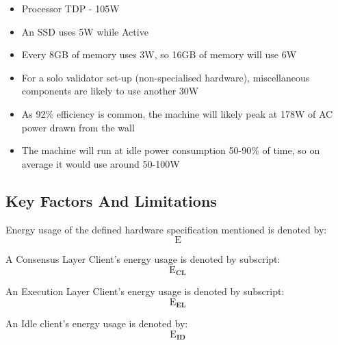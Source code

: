 \begin{itemize}
    \item Processor TDP - 105W
    
    \item An SSD uses 5W while Active
    
    \item Every 8GB of memory uses 3W, so 16GB of memory will use 6W
    
    \item For a solo validator set-up (non-specialised hardware), miscellaneous components are likely to use another 30W
    
    \item As 92\% efficiency is common, the machine will likely peak at 178W of AC power drawn from the wall
    
    \item The machine will run at idle power consumption 50-90\% of time, so on average it would use around 50-100W
    
\end{itemize}







\subsection {Key Factors And Limitations}


Energy usage of the defined hardware specification mentioned is denoted by:
\label{CCRIEquation}
\begin{equation*}
    \boldsymbol{\mathrm{E}}
\end{equation*} 

A Consensus Layer Client's energy usage is denoted by subscript:
\begin{equation*}
    \boldsymbol{\mathrm{E}_{CL}}
\end{equation*}

An Execution Layer Client's energy usage is denoted by subscript:
\begin{equation*}
    \boldsymbol{\mathrm{E}_{EL}}
\end{equation*}
 
 An Idle client's energy usage is denoted by: \begin{equation*}
    \boldsymbol{\mathrm{E}_{ID}}
\end{equation*} 


